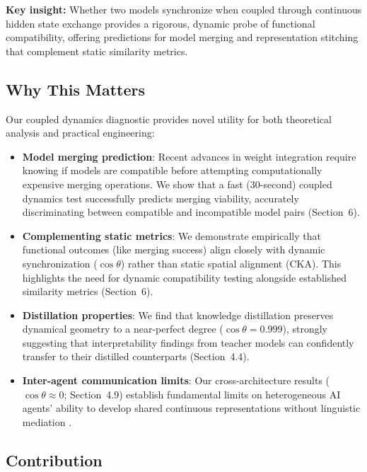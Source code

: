 \documentclass[10pt]{article} %
\theoremstyle{plain}
\theoremstyle{definition}
\theoremstyle{remark}
\begin{document}
\textbf{Key insight:} Whether two models synchronize when coupled through continuous hidden state exchange provides a rigorous, dynamic probe of functional compatibility, offering predictions for model merging and representation stitching that complement static similarity metrics.

\subsection{Why This Matters}

Our coupled dynamics diagnostic provides novel utility for both theoretical analysis and practical engineering:

\begin{itemize}
    \item \textbf{Model merging prediction}: Recent advances in weight integration require knowing if models are compatible before attempting computationally expensive merging operations. We show that a fast (30-second) coupled dynamics test successfully predicts merging viability, accurately discriminating between compatible and incompatible model pairs (Section~6).
    
    \item \textbf{Complementing static metrics}: We demonstrate empirically that functional outcomes (like merging success) align closely with dynamic synchronization ($\cos \theta$) rather than static spatial alignment (CKA). This highlights the need for dynamic compatibility testing alongside established similarity metrics (Section~6).
    
    \item \textbf{Distillation properties}: We find that knowledge distillation preserves dynamical geometry to a near-perfect degree ($\cos \theta = 0.999$), strongly suggesting that interpretability findings \citep{elhage2021mathematical} from teacher models can confidently transfer to their distilled counterparts (Section~4.4).
    
    \item \textbf{Inter-agent communication limits}: Our cross-architecture results ($\cos \theta \approx 0$; Section~4.9) establish fundamental limits on heterogeneous AI agents' ability to develop shared continuous representations without linguistic mediation \citep{moschella2023relative}.
\end{itemize}

\subsection{Contribution}
\end{document}
